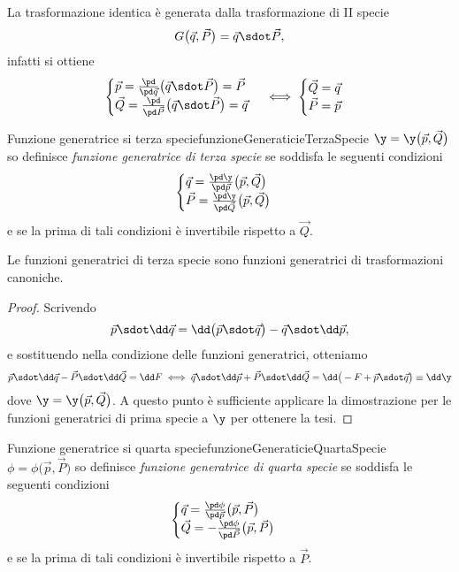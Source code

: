 \begin{ese}
	La trasformazione identica è generata dalla trasformazione di II specie
	\[
		G\big(\vec{q},\vec{P}\big) = \vec{q} \sdot \vec{P},
	\]
	infatti si ottiene
	\[
		\begin{cases}
			\vec{p} = \frac{\pd}{\pd\vec{q}}\big(\vec{q}\sdot\vec{P}\big) = \vec{P} \\
			\vec{Q} = \frac{\pd}{\pd\vec{P}}\big(\vec{q}\sdot\vec{P}\big) = \vec{q}
		\end{cases} \iff
		\begin{cases}
			\vec{Q} = \vec{q} \\
			\vec{P} = \vec{p}
		\end{cases}
	\]
\end{ese}

\begin{defn}{Funzione generatrice si terza specie}{funzioneGeneraticieTerzaSpecie}
	\(\y=\y\big(\vec{p},\vec{Q}\big)\) so definisce \emph{funzione generatrice di terza specie} se soddisfa le seguenti condizioni
	\[
		\begin{cases}
			\vec{q} = \frac{\pd \y}{\pd\vec{p}}\big(\vec{p},\vec{Q}\big) \\
			\vec{P} = \frac{\pd \y}{\pd\vec{Q}}\big(\vec{p},\vec{Q}\big)
		\end{cases}
	\]
	e se la prima di tali condizioni è invertibile rispetto a \(\vec{Q}\).
\end{defn}

\begin{pr}
	Le funzioni generatrici di terza specie sono funzioni generatrici di trasformazioni canoniche.
\end{pr}

\begin{proof}
	Scrivendo
	\[
		\vec{p} \sdot \dd\vec{q} = \dd\big(\vec{p}\sdot\vec{q}\big) - \vec{q}\sdot \dd\vec{p},
	\]
	e sostituendo nella condizione delle funzioni generatrici, otteniamo
	\[
		\vec{p} \sdot \dd\vec{q} - \vec{P} \sdot \dd\vec{Q} = \dd F \iff \vec{q} \sdot \dd\vec{p} + \vec{P} \sdot \dd\vec{Q} = \dd\big(-F+\vec{p}\sdot\vec{q}\big) \equiv \dd\y
	\]
	dove \(\y=\y\big(\vec{p},\vec{Q}\big)\).
	A questo punto è sufficiente applicare la dimostrazione per le funzioni generatrici di prima specie a \(\y\) per ottenere la tesi.
\end{proof}

\begin{defn}{Funzione generatrice si quarta specie}{funzioneGeneraticieQuartaSpecie}
	\(\phi=\phi\big(\vec{p},\vec{P}\big)\) so definisce \emph{funzione generatrice di quarta specie} se soddisfa le seguenti condizioni
	\[
		\begin{cases}
			\vec{q} = \frac{\pd \phi}{\pd\vec{p}}\big(\vec{p},\vec{P}\big) \\
			\vec{Q} = -\frac{\pd \phi}{\pd\vec{P}}\big(\vec{p},\vec{P}\big)
		\end{cases}
	\]
	e se la prima di tali condizioni è invertibile rispetto a \(\vec{P}\).
\end{defn}

